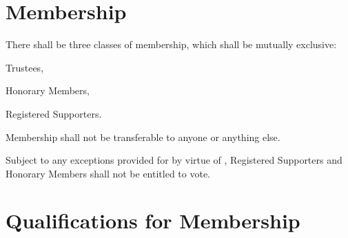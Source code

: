 \documentclass[10pt]{mk-articles-of-association}
\begin{document}
\section{Membership}
  \begin{constenum}

  \item There shall be three classes of membership, which shall be mutually
    exclusive:
    \begin{constenum}
      \item Trustees,
      \item Honorary Members, \ITand
      \item Registered Supporters.
    \end{constenum}

  \item Membership shall not be transferable to anyone or anything else.

  \item Subject to any exceptions provided for by virtue of
    ,
    Registered Supporters and
    Honorary Members shall not be entitled to vote.

\end{constenum}



\section{Qualifications for Membership}
\end{document}
